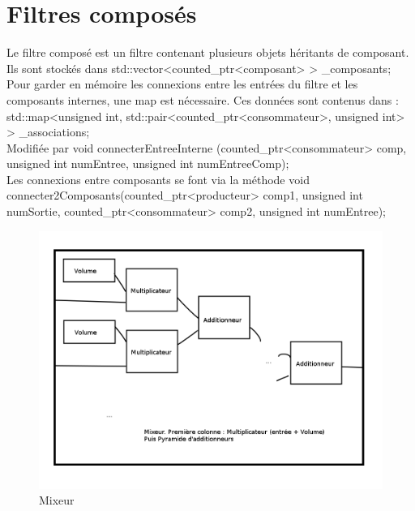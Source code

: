 \documentclass{article}
\begin{document}
\section{Filtres composés}
Le filtre composé est un filtre contenant plusieurs objets héritants de composant.\\
Ils sont stockés dans std::vector<counted\_ptr<composant>  > \_composants;\\
Pour garder en mémoire les connexions entre les entrées du filtre et les composants internes, une map est nécessaire. Ces données sont contenus dans : \\
std::map<unsigned int, std::pair<counted\_ptr<consommateur>, unsigned int> > \_associations;\\
Modifiée par void connecterEntreeInterne (counted\_ptr<consommateur> comp, unsigned int numEntree, unsigned int numEntreeComp);\\
Les connexions entre composants se font via la méthode void connecter2Composants(counted\_ptr<producteur> comp1, unsigned int numSortie,	counted\_ptr<consommateur> comp2, unsigned int numEntree);\\

\begin{figure}
	\begin{center}
		\includegraphics[scale=0.25]{mixeur}\\
		Mixeur
	\end{center}
\end{figure}
\end{document}
